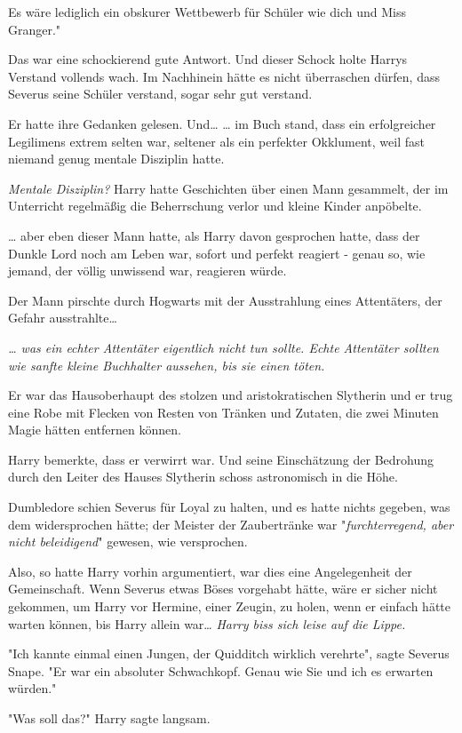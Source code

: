 {Es wäre lediglich ein obskurer Wettbewerb für Schüler wie dich und Miss Granger."

Das war eine schockierend gute Antwort. Und dieser Schock holte Harrys Verstand vollends wach. Im Nachhinein hätte es nicht überraschen dürfen, dass Severus seine Schüler verstand, sogar sehr gut verstand.

Er hatte ihre Gedanken gelesen. Und… … im Buch stand, dass ein erfolgreicher Legilimens extrem selten war, seltener als ein perfekter Okklument, weil fast niemand genug mentale Disziplin hatte.

\emph{Mentale Disziplin?} Harry hatte Geschichten über einen Mann gesammelt, der im Unterricht regelmäßig die Beherrschung verlor und kleine Kinder anpöbelte.

… aber eben dieser Mann hatte, als Harry davon gesprochen hatte, dass der Dunkle Lord noch am Leben war, sofort und perfekt reagiert - genau so, wie jemand, der völlig unwissend war, reagieren würde.

Der Mann pirschte durch Hogwarts mit der Ausstrahlung eines Attentäters, der Gefahr ausstrahlte…

\emph{… was ein echter Attentäter eigentlich nicht tun sollte. Echte Attentäter sollten wie sanfte kleine Buchhalter aussehen, bis sie einen töten.}

Er war das Hausoberhaupt des stolzen und aristokratischen Slytherin und er trug eine Robe mit Flecken von Resten von Tränken und Zutaten, die zwei Minuten Magie hätten entfernen können.

Harry bemerkte, dass er verwirrt war. Und seine Einschätzung der Bedrohung durch den Leiter des Hauses Slytherin schoss astronomisch in die Höhe.

Dumbledore schien Severus für Loyal zu halten, und es hatte nichts gegeben, was dem widersprochen hätte; der Meister der Zaubertränke war "\emph{furchterregend, aber nicht beleidigend}" gewesen, wie versprochen.

Also, so hatte Harry vorhin argumentiert, war dies eine Angelegenheit der Gemeinschaft. Wenn Severus etwas Böses vorgehabt hätte, wäre er sicher nicht gekommen, um Harry vor Hermine, einer Zeugin, zu holen, wenn er einfach hätte warten können, bis Harry allein war… \emph{Harry biss sich leise auf die Lippe.}

"Ich kannte einmal einen Jungen, der Quidditch wirklich verehrte", sagte Severus Snape. "Er war ein absoluter Schwachkopf. Genau wie Sie und ich es erwarten würden."

"Was soll das?" Harry sagte langsam.

}
